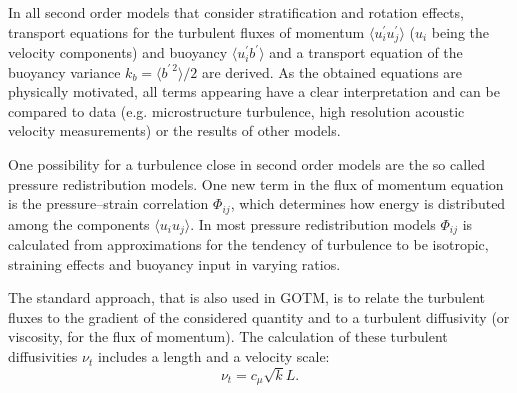 In all second order models that consider stratification and rotation effects, transport equations for the turbulent fluxes of momentum $\langle u_i^\prime u_j^\prime \rangle$ ($u_i$ being the velocity components) and buoyancy $\langle u_i^\prime b^\prime \rangle$ and a transport equation of the buoyancy variance $k_b = \langle b^{\prime \, 2} \rangle \slash 2 $ are derived. As the obtained equations are physically motivated, all terms appearing have a clear interpretation and can be compared to data (e.g. microstructure turbulence, high resolution acoustic velocity measurements) or the results of other models. 

One possibility for a turbulence close in second order models are the so called pressure redistribution models. One new term in the flux of momentum equation is the pressure--strain correlation $\Phi_{ij}$, which determines how energy is distributed among the components $\langle u_i u_j \rangle$. In most pressure redistribution models $\Phi_{ij}$ is calculated from approximations for the tendency of turbulence to be isotropic, straining effects and buoyancy input in varying ratios.



The standard approach, that is also used in GOTM, is to relate the turbulent fluxes to the gradient of the considered quantity and to a turbulent diffusivity (or viscosity, for the flux of momentum). The calculation of these turbulent diffusivities $\nu_t$ includes a length and a velocity scale:
\begin{equation}
 \label{turbulence}
 \nu_t = c_\mu \sqrt{k} L.
\end{equation}

